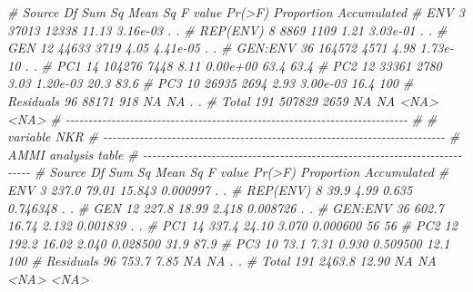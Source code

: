 \documentclass[
]{book}
\newenvironment{Shaded}{\begin{snugshade}}{\end{snugshade}}
\newcommand{\CommentTok}[1]{\textcolor[rgb]{0.56,0.35,0.01}{\textit{#1}}}
\numberwithin{equation}{section}
\begin{document}
\begin{Shaded}
\begin{Highlighting}[]
\CommentTok{\#     Source  Df Sum Sq Mean Sq F value   Pr(\textgreater{}F) Proportion Accumulated}
\CommentTok{\#        ENV   3  37013   12338   11.13 3.16e{-}03          .           .}
\CommentTok{\#   REP(ENV)   8   8869    1109    1.21 3.03e{-}01          .           .}
\CommentTok{\#        GEN  12  44633    3719    4.05 4.41e{-}05          .           .}
\CommentTok{\#    GEN:ENV  36 164572    4571    4.98 1.73e{-}10          .           .}
\CommentTok{\#        PC1  14 104276    7448    8.11 0.00e+00       63.4        63.4}
\CommentTok{\#        PC2  12  33361    2780    3.03 1.20e{-}03       20.3        83.6}
\CommentTok{\#        PC3  10  26935    2694    2.93 3.00e{-}03       16.4         100}
\CommentTok{\#  Residuals  96  88171     918      NA       NA          .           .}
\CommentTok{\#      Total 191 507829    2659      NA       NA       \textless{}NA\textgreater{}        \textless{}NA\textgreater{}}
\CommentTok{\# {-}{-}{-}{-}{-}{-}{-}{-}{-}{-}{-}{-}{-}{-}{-}{-}{-}{-}{-}{-}{-}{-}{-}{-}{-}{-}{-}{-}{-}{-}{-}{-}{-}{-}{-}{-}{-}{-}{-}{-}{-}{-}{-}{-}{-}{-}{-}{-}{-}{-}{-}{-}{-}{-}{-}{-}{-}{-}{-}{-}{-}{-}{-}{-}{-}{-}{-}{-}{-}{-}{-}{-}{-}{-}{-}}
\CommentTok{\# }
\CommentTok{\# variable NKR }
\CommentTok{\# {-}{-}{-}{-}{-}{-}{-}{-}{-}{-}{-}{-}{-}{-}{-}{-}{-}{-}{-}{-}{-}{-}{-}{-}{-}{-}{-}{-}{-}{-}{-}{-}{-}{-}{-}{-}{-}{-}{-}{-}{-}{-}{-}{-}{-}{-}{-}{-}{-}{-}{-}{-}{-}{-}{-}{-}{-}{-}{-}{-}{-}{-}{-}{-}{-}{-}{-}{-}{-}{-}{-}{-}{-}{-}{-}}
\CommentTok{\# AMMI analysis table}
\CommentTok{\# {-}{-}{-}{-}{-}{-}{-}{-}{-}{-}{-}{-}{-}{-}{-}{-}{-}{-}{-}{-}{-}{-}{-}{-}{-}{-}{-}{-}{-}{-}{-}{-}{-}{-}{-}{-}{-}{-}{-}{-}{-}{-}{-}{-}{-}{-}{-}{-}{-}{-}{-}{-}{-}{-}{-}{-}{-}{-}{-}{-}{-}{-}{-}{-}{-}{-}{-}{-}{-}{-}{-}{-}{-}{-}{-}}
\CommentTok{\#     Source  Df Sum Sq Mean Sq F value   Pr(\textgreater{}F) Proportion Accumulated}
\CommentTok{\#        ENV   3  237.0   79.01  15.843 0.000997          .           .}
\CommentTok{\#   REP(ENV)   8   39.9    4.99   0.635 0.746348          .           .}
\CommentTok{\#        GEN  12  227.8   18.99   2.418 0.008726          .           .}
\CommentTok{\#    GEN:ENV  36  602.7   16.74   2.132 0.001839          .           .}
\CommentTok{\#        PC1  14  337.4   24.10   3.070 0.000600         56          56}
\CommentTok{\#        PC2  12  192.2   16.02   2.040 0.028500       31.9        87.9}
\CommentTok{\#        PC3  10   73.1    7.31   0.930 0.509500       12.1         100}
\CommentTok{\#  Residuals  96  753.7    7.85      NA       NA          .           .}
\CommentTok{\#      Total 191 2463.8   12.90      NA       NA       \textless{}NA\textgreater{}        \textless{}NA\textgreater{}}

\end{Highlighting}
\end{Shaded}
\end{document}
